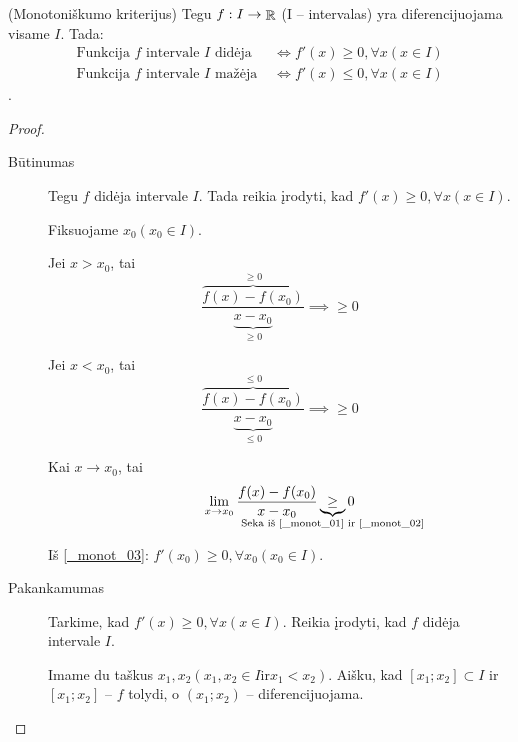 \begin{prop}
  (Monotoniškumo kriterijus) Tegu $f: I \to \mathop{\mathbb{R}}$ (I – intervalas) yra
  diferencijuojama visame $I$. Tada:
  \begin{align*}
    \text{Funkcija } f \text{ intervale } I \text{ didėja } 
    &\iff f'(x) \geq 0, \forall x (x \in I) \\
    \text{Funkcija } f \text{ intervale } I \text{ mažėja } 
    &\iff f'(x) \leq 0, \forall x (x \in I)
  \end{align*}.

  \begin{proof}
    \begin{description}
      \item[Būtinumas] Tegu $f$ didėja intervale $I$. Tada reikia įrodyti,
        kad $f'(x) \geq 0, \forall x (x \in I)$. 
        
        Fiksuojame $x_{0} (x_{0} \in I)$.

        Jei $x > x_{0}$, tai
        \begin{equation}
          \frac{\overbrace{f(x) - f(x_{0})}^{\geq 0}}{
            \underbrace{x - x_{0}}_{\geq 0}} 
          \implies \geq 0
          \label{_monot_01}
        \end{equation}

        Jei $x < x_{0}$, tai
        \begin{equation}
          \frac{\overbrace{f(x) - f(x_{0})}^{\leq 0}}{
            \underbrace{x - x_{0}}_{\leq 0}}
          \implies \geq 0
          \label{_monot_02}
        \end{equation}

        Kai $x \to x_{0}$, tai 
        \begin{equation}
          \lim_{x \to x_{0}} \frac{f(x) - f(x_{0})}{x - x_{0}}
          \underbrace{\geq}_{
            \mathclap{\text{Seka iš \ref{_monot_01} ir \ref{_monot_02}}}}
          0
          \label{_monot_03}
        \end{equation}

        Iš \ref{_monot_03}: 
        $f'(x_{0}) \geq 0, \forall x_{0} (x_{0} \in I).$
      \item[Pakankamumas] Tarkime, kad 
        $f'(x) \geq 0, \forall x (x \in I)$. Reikia įrodyti, kad 
        $f$ didėja intervale $I$.

        Imame du taškus 
        $x_{1}, x_{2} (x_{1},x_{2} \in I \text{ir} x_{1} < x_{2})$.
        Aišku, kad $[x_{1};x_{2}] \subset I$ ir $[x_{1}; x_{2}]$ –
        $f$ tolydi, o $(x_{1}; x_{2})$ – diferencijuojama.


\end{description}
\end{proof}
\end{prop}
